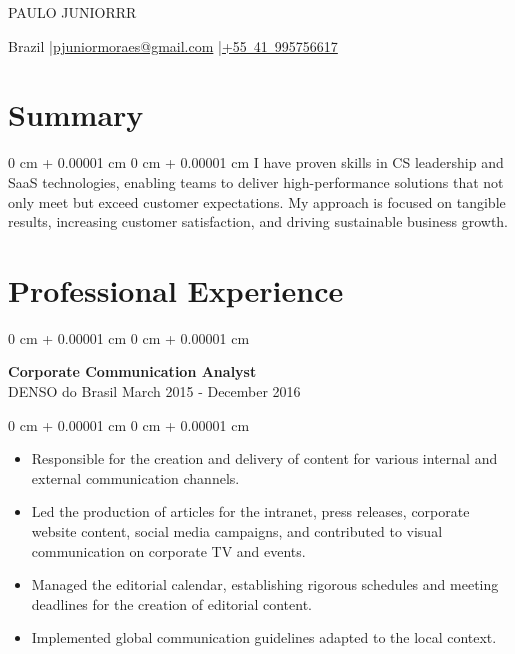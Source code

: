 \documentclass[10pt, letterpaper]{article}
\newenvironment{highlights}{
    \begin{itemize}[
        topsep=0.10 cm,
        parsep=0.10 cm,
        partopsep=0pt,
        itemsep=0pt,
        leftmargin=0 cm + 10pt
    ]
}{
    \end{itemize}
}
\newenvironment{onecolentry}{
    \begin{adjustwidth}{
        0 cm + 0.00001 cm
    }{
        0 cm + 0.00001 cm
    }
}{
    \end{adjustwidth}
}
\newenvironment{header}{
    \setlength{\topsep}{0pt}\par\kern\topsep\centering\linespread{1.5}
}{
    \par\kern\topsep
}
\begin{document}
\begin{header}
    {\fontsize{25pt}{25pt}\selectfont PAULO JUNIORRR}

    \vspace{0pt}

    \normalsize
    \mbox{Brazil} \enskip|\enskip \mbox{\href{mailto:pjuniormoraes@gmail.com}{pjuniormoraes@gmail.com}} \enskip|\enskip \mbox{\href{tel:+5541995756617}{+55 41 995756617}} \\
    
\end{header}

\vspace{5pt - 0.1cm}

\section{Summary}
\begin{onecolentry}{I have proven skills in CS leadership and SaaS technologies, enabling teams to deliver high-performance solutions that not only meet but exceed customer expectations. My approach is focused on tangible results, increasing customer satisfaction, and driving sustainable business growth.}\end{onecolentry}
\section{Professional Experience}

\begin{onecolentry}
    \setcolumnwidth{\fill, 4.5cm}
    \begin{paracol}{2}
        \textbf{Corporate Communication Analyst} \\ DENSO do Brasil
        \switchcolumn
        \raggedleft March 2015 - December 2016
    \end{paracol}
\end{onecolentry}
\vspace{0.10cm}
\begin{onecolentry}
    \begin{highlights}
                \item Responsible for the creation and delivery of content for various internal and external communication channels.
                \item Led the production of articles for the intranet, press releases, corporate website content, social media campaigns, and contributed to visual communication on corporate TV and events.
                \item Managed the editorial calendar, establishing rigorous schedules and meeting deadlines for the creation of editorial content.
                \item Implemented global communication guidelines adapted to the local context.
    \end{highlights}
\end{onecolentry}
\end{document}

